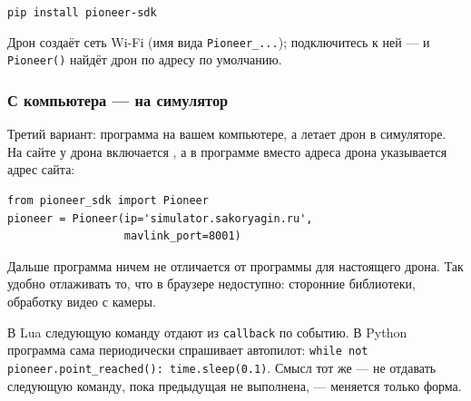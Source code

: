 \begin{codebox}[Терминал]
\texttt{pip install pioneer-sdk}
\end{codebox}

Дрон создаёт сеть Wi-Fi (имя вида \texttt{Pioneer\_...}); подключитесь к ней --- и \verb|Pioneer()| найдёт дрон по адресу по умолчанию.

\subsubsection*{С компьютера --- на симулятор}
\label{sec:python-external}

Третий вариант: программа на вашем компьютере, а летает дрон в симуляторе. На сайте у дрона включается , а в программе вместо адреса дрона указывается адрес сайта:

\begin{codebox}
\begin{verbatim}
from pioneer_sdk import Pioneer
pioneer = Pioneer(ip='simulator.sakoryagin.ru',
                  mavlink_port=8001)
\end{verbatim}
\end{codebox}

Дальше программа ничем не отличается от программы для настоящего дрона. Так удобно отлаживать то, что в браузере недоступно: сторонние библиотеки, обработку видео с камеры.

\begin{infobox}
В Lua следующую команду отдают из \verb|callback| по событию. В Python программа сама периодически спрашивает автопилот: \verb|while not pioneer.point_reached(): time.sleep(0.1)|. Смысл тот же --- не отдавать следующую команду, пока предыдущая не выполнена, --- меняется только форма.
\end{infobox}
